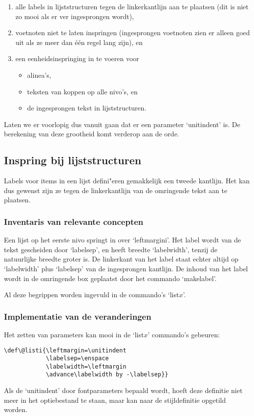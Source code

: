 \documentclass[a4paper]{artikel1} %
\begin{document}
\begin{enumerate}
\item alle labels in lijststructuren tegen de linkerkantlijn aan te
  plaatsen (dit is niet zo mooi als er ver ingesprongen wordt),
\item voetnoten niet te laten inspringen (ingesprongen voetnoten zien
  er alleen goed uit als ze meer dan \'e\'en regel lang zijn), en
\item een eenheidsinspringing in te voeren voor
 \begin{itemize}
 \item alinea's,
 \item teksten van koppen op alle nivo's, en
 \item de ingesprongen tekst in lijststructuren.
 \end{itemize}
\end{enumerate}
Laten we er voorlopig dus vanuit gaan dat er een parameter
`unitindent' is. De berekening van deze grootheid komt verderop aan de
orde.
 
\subsection{Inspring bij lijststructuren}
 
Labels voor items in een lijst defini"eren gemakkelijk een tweede
kantlijn. Het kan dus gewenst zijn ze tegen de linkerkantlijn van de
omringende tekst aan te plaatsen.
 
\subsubsection{Inventaris van relevante concepten}
Een lijst op het eerste nivo springt in over `leftmargini'.  Het label
wordt van de tekst gescheiden door `labelsep', en heeft breedte
`labelwidth', tenzij de natuurlijke breedte groter is.  De linkerkant
van het label staat echter altijd op `labelwidth' plus `labelsep' van
de ingesprongen kantlijn.  De inhoud van het label wordt in de
omringende box geplaatst door het commando `makelabel'.
 
Al deze begrippen worden ingevuld in de commando's `list$x$'.
 
\subsubsection{Implementatie van de veranderingen}
Het zetten van parameters kan mooi in de `list$x$' commando's
gebeuren:
\begin{verbatim}
\def\@listi{\leftmargin=\unitindent
            \labelsep=\enspace
            \labelwidth=\leftmargin
            \advance\labelwidth by -\labelsep}}
\end{verbatim}
Als de `unitindent' door fontparameters bepaald wordt, hoeft deze
definitie niet meer in het optiebestand te staan, maar kan naar de
stijldefinitie opgetild worden.
 
\end{document}
